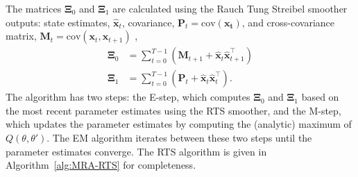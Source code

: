 \documentclass[11pt,draftcls,onecolumn,peerreview]{IEEEtran}
\begin{document}
The matrices $\boldsymbol\Xi_0$ and $\boldsymbol\Xi_1$ are calculated using the Rauch Tung Streibel smoother \cite{RAUCH1965} outputs: state estimates, $\hat{\mathbf x}_t$, covariance, $\mathbf P_t=\mathrm{cov}(\mathbf{x_t})$, and cross-covariance matrix, $\mathbf M_t=\mathrm{cov}(\mathbf{x}_{t},\mathbf{x}_{t+1})$ \cite{Gibsona2005},
\begin{align}\label{eq:Xivariables}
\boldsymbol\Xi_0&=\sum_{t=0}^{T-1}\left(\mathbf M_{t+1}+\mathbf{\hat x}_t\mathbf{\hat x}_{t+1}^\top\right) \\
 \boldsymbol\Xi_1&=\sum_{t=0}^{T-1}\left(\mathbf P_t+\mathbf{\hat x}_t\mathbf{\hat x}_t^\top\right).
\end{align}
The algorithm has two steps: the E-step, which computes $\boldsymbol\Xi_0$ and $\boldsymbol\Xi_1$ based on the most recent parameter estimates using the RTS smoother, and the M-step, which updates the parameter estimates by computing the (analytic) maximum of $Q(\theta,\theta')$. The EM algorithm iterates between these two steps until the parameter estimates converge. The RTS  algorithm is given in Algorithm~\ref{alg:MRA-RTS} for completeness. 
\end{document}
